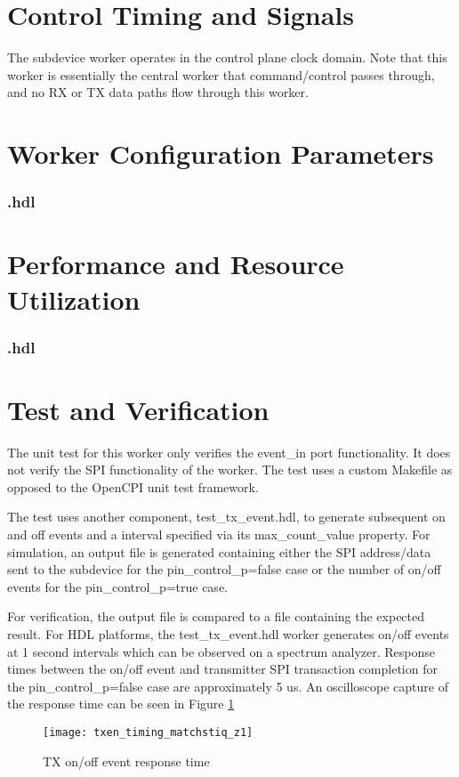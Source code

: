 \section*{Control Timing and Signals}
The \Comp{} subdevice worker operates in the control plane clock domain. Note that this worker is essentially the central worker that command/control passes through, and no RX or TX data paths flow through this worker.

\begin{landscape}
\section*{Worker Configuration Parameters}
\subsubsection*{\comp.hdl}
%
\section*{Performance and Resource Utilization}
\subsubsection*{\comp.hdl}
%
\end{landscape}

\section*{Test and Verification}
\begin{flushleft}
The unit test for this worker only verifies the event\_in port functionality. It does not verify the SPI functionality of the worker. The test uses a custom Makefile as opposed to the OpenCPI unit test framework.\par\medskip

The test uses another component, test\_tx\_event.hdl, to generate subsequent on and off events and a interval specified via its max\_count\_value property. For simulation, an output file is generated containing either the SPI address/data sent to the subdevice for the pin\_control\_p=false case or the number of on/off events for the pin\_control\_p=true case.\par\medskip

For verification, the output file is compared to a file containing the expected result. For HDL platforms, the test\_tx\_event.hdl worker generates on/off events at 1 second intervals which can be observed on a spectrum analyzer. Response times between the on/off event and transmitter SPI transaction completion for the pin\_control\_p=false case are approximately 5 us. An oscilloscope capture of the response time can be seen in Figure \ref{fig:response_time}
\begin{figure}[ht]
	\centerline{\texttt{[image: txen\_timing\_matchstiq\_z1]}}
	\caption{TX on/off event response time}
	\label{fig:response_time}
\end{figure}
\end{flushleft}
